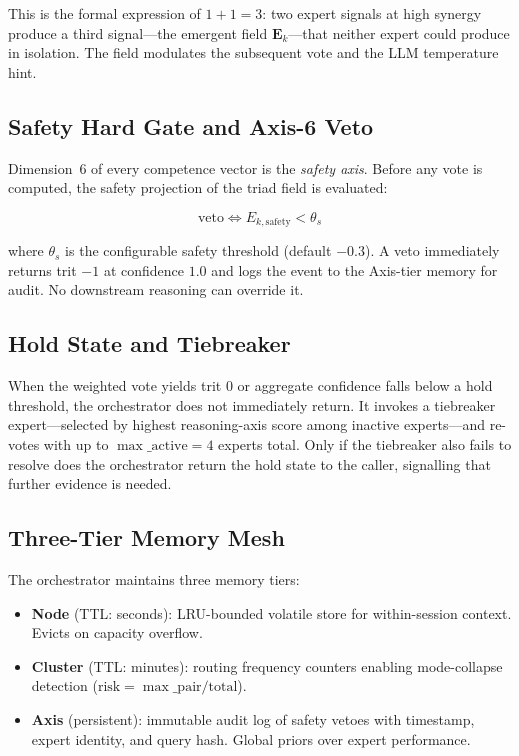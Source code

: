 \documentclass[journal,10pt,twocolumn]{IEEEtran}
\begin{document}
This is the formal expression of $1{+}1{=}3$: two expert signals at high
synergy produce a third signal—the emergent field $\mathbf{E}_k$—that
neither expert could produce in isolation. The field modulates the
subsequent vote and the LLM temperature hint.

\subsection{Safety Hard Gate and Axis-6 Veto}

Dimension~6 of every competence vector is the \emph{safety axis}. Before
any vote is computed, the safety projection of the triad field is evaluated:

\begin{equation}
  \text{veto} \iff E_{k,\text{safety}} < \theta_s
  \label{eq:veto}
\end{equation}

where $\theta_s$ is the configurable safety threshold (default $-0.3$).
A veto immediately returns trit $-1$ at confidence $1.0$ and logs the event
to the Axis-tier memory for audit. No downstream reasoning can override it.

\subsection{Hold State and Tiebreaker}

When the weighted vote yields trit $0$ or aggregate confidence falls below
a hold threshold, the orchestrator does not immediately return. It invokes a
tiebreaker expert—selected by highest reasoning-axis score among inactive
experts—and re-votes with up to $\max\_\text{active}=4$ experts total. Only
if the tiebreaker also fails to resolve does the orchestrator return the
hold state to the caller, signalling that further evidence is needed.

\subsection{Three-Tier Memory Mesh}

The orchestrator maintains three memory tiers:

\begin{itemize}
  \item \textbf{Node} (TTL: seconds): LRU-bounded volatile store for
        within-session context. Evicts on capacity overflow.
  \item \textbf{Cluster} (TTL: minutes): routing frequency counters enabling
        mode-collapse detection ($\text{risk} = \max\_\text{pair} / \text{total}$).
  \item \textbf{Axis} (persistent): immutable audit log of safety vetoes with
        timestamp, expert identity, and query hash. Global priors over expert
        performance.
\end{itemize}
\end{document}
